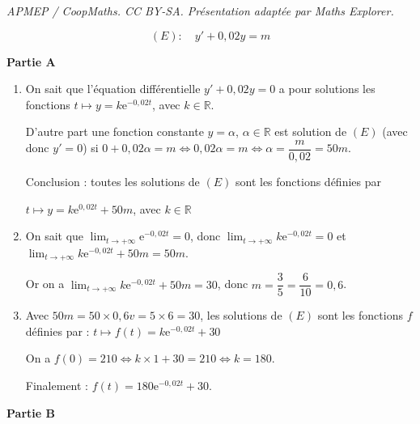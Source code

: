 \documentclass[10pt]{article}
\providecommand{\R}{\mathbb{R}}
\providecommand{\e}{{\mathrm{e}}}
\begin{document}
\noindent\textit{APMEP / CoopMaths. CC BY-SA. Présentation adaptée par Maths Explorer.}\par\medskip
\medskip







\[(E) : \quad  y'  +0,02y = m\]

\medskip

\textbf{Partie A}

\medskip

\begin{enumerate}
\item 







On sait que l'équation différentielle $y' + 0,02y = 0$ a pour solutions les fonctions $t \longmapsto y = k\e^{-0,02t}$, avec $k \in \R$.

D'autre part une fonction constante $y = \alpha$, \:$\alpha \in \R$ est solution de $(E)$ (avec donc $y' = 0$) si $0 + 0,02\alpha = m \iff 0,02\alpha = m \iff \alpha = \dfrac{m}{0,02} = 50m$.

Conclusion : toutes les solutions de $(E)$ sont les fonctions définies par 
\begin{center} $t \longmapsto y = k\e^{0,02t} + 50m$, \: avec $k \in \R$\end{center}
\item 


On sait que $\displaystyle\lim_{t \to + \infty} \e^{-0,02t} = 0$, donc $\displaystyle\lim_{t \to + \infty} k\e^{-0,02t} = 0$ et $\displaystyle\lim_{t \to + \infty} k\e^{-0,02t} + 50m = 50m$.

Or on a $\displaystyle\lim_{t \to + \infty} k\e^{-0,02t} + 50m  = 30$, donc $m = \dfrac35 = \dfrac{6}{10} = 0,6$.
\item 

Avec $50m = 50 \times 0,6 v= 5 \times 6 = 30$, les solutions de $(E)$ sont les fonctions $f$ définies par : $ t \longmapsto f(t) = k\e^{-0,02t} + 30$

On a $f(0) = 210 \iff k \times 1 + 30 = 210 \iff k = 180$.

Finalement : $f(t) = 180\e^{-0,02t} + 30$.
\end{enumerate}

\medskip

\textbf{Partie B}

\medskip
\end{document}
